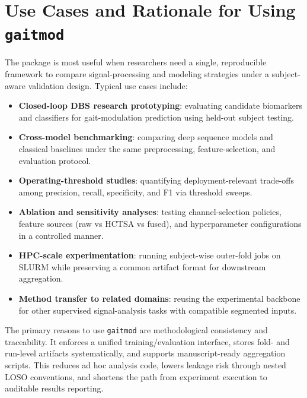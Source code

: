 \section{Use Cases and Rationale for Using \texttt{gaitmod}}
\label{sec:reproducibility_use_cases}
The package is most useful when researchers need a single, reproducible framework to compare signal-processing and modeling strategies under a subject-aware validation design. Typical use cases include:
\begin{itemize}
\item \textbf{Closed-loop DBS research prototyping}: evaluating candidate biomarkers and classifiers for gait-modulation prediction using held-out subject testing.
\item \textbf{Cross-model benchmarking}: comparing deep sequence models and classical baselines under the same preprocessing, feature-selection, and evaluation protocol.
\item \textbf{Operating-threshold studies}: quantifying deployment-relevant trade-offs among precision, recall, specificity, and F1 via threshold sweeps.
\item \textbf{Ablation and sensitivity analyses}: testing channel-selection policies, feature sources (raw vs HCTSA vs fused), and hyperparameter configurations in a controlled manner.
\item \textbf{HPC-scale experimentation}: running subject-wise outer-fold jobs on SLURM while preserving a common artifact format for downstream aggregation.
\item \textbf{Method transfer to related domains}: reusing the experimental backbone for other supervised signal-analysis tasks with compatible segmented inputs.
\end{itemize}

The primary reasons to use \texttt{gaitmod} are methodological consistency and traceability. It enforces a unified training/evaluation interface, stores fold- and run-level artifacts systematically, and supports manuscript-ready aggregation scripts. This reduces ad hoc analysis code, lowers leakage risk through nested LOSO conventions, and shortens the path from experiment execution to auditable results reporting.

